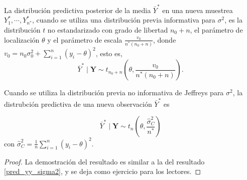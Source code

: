     \begin{Res}\label{pred_barY_sigma2}
    La distribuci\'on predictiva posterior de la media $\bar{Y}^* $ en una nueva muestrea $Y_1^*,\cdots,Y_{n^*}^*$, cuando se utiliza una distribuci\'on previa informativa para $\sigma^2$, es la distribuci\'on $t$ no estandarizado con grado de libertad $n_0+n$, el par\'ametro de localizaci\'on $\theta$ y el par\'ametro de escala $\frac{v_0}{n^*(n_0+n)}$, donde $v_0=n_0\sigma^2_0+\sum_{i=1}^n(y_i-\theta)^2$, esto es, 
    \begin{equation*}
    \bar{Y}^* \mid \mathbf{Y}\sim t_{n_0+n}\left(\theta,\frac{v_0}{n^*(n_0+n)}\right).
    \end{equation*} 
    
    Cuando se utiliza la distribuci\'on previa no informativa de Jeffreys para $\sigma^2$, la distrubci\'on predictiva de una nueva observaci\'on $\bar{Y}^*$ es
    
    \begin{equation*}
    \bar{Y}^* \mid \mathbf{Y}\sim t_n\left(\theta,\frac{\hat{\sigma}^2_C}{n^*}\right)
    \end{equation*} 
    con $\hat{\sigma}^2_C=\frac{1}{n}\sum_{i=1}^n(y_i-\theta)^2$. 
    \end{Res}
    
    \begin{proof}
    La demostraci\'on del resultado es similar a la del resultado \ref{pred_yy_sigma2}, y se deja como ejercicio para los lectores.
    \end{proof}
    
